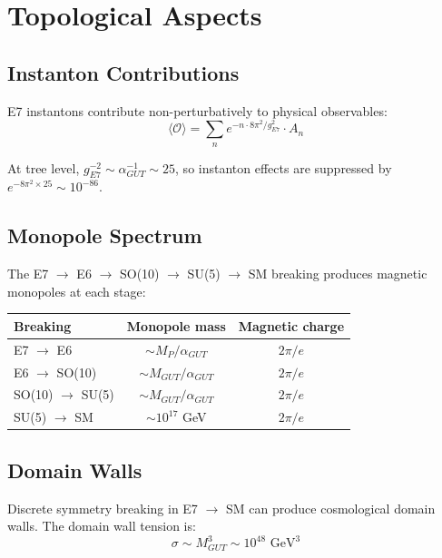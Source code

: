 \documentclass[11pt,a4paper]{article}
\begin{document}
\section{Topological Aspects}

\subsection{Instanton Contributions}

E7 instantons contribute non-perturbatively to physical observables:
\begin{equation}
\langle \mathcal{O} \rangle = \sum_n e^{-n \cdot 8\pi^2/g_{E7}^2} \cdot A_n
\end{equation}

At tree level, $g_{E7}^{-2} \sim \alpha_{GUT}^{-1} \sim 25$, so instanton effects are suppressed by $e^{-8\pi^2 \times 25} \sim 10^{-86}$.

\subsection{Monopole Spectrum}

The E7 $\to$ E6 $\to$ SO(10) $\to$ SU(5) $\to$ SM breaking produces magnetic monopoles at each stage:
\begin{center}
\begin{tabular}{|l|c|c|}
\hline
\textbf{Breaking} & \textbf{Monopole mass} & \textbf{Magnetic charge} \\
\hline
E7 $\to$ E6 & $\sim M_P / \alpha_{GUT}$ & $2\pi/e$ \\
E6 $\to$ SO(10) & $\sim M_{GUT} / \alpha_{GUT}$ & $2\pi/e$ \\
SO(10) $\to$ SU(5) & $\sim M_{GUT} / \alpha_{GUT}$ & $2\pi/e$ \\
SU(5) $\to$ SM & $\sim 10^{17}$ GeV & $2\pi/e$ \\
\hline
\end{tabular}
\end{center}

\subsection{Domain Walls}

Discrete symmetry breaking in E7 $\to$ SM can produce cosmological domain walls. The domain wall tension is:
\begin{equation}
\sigma \sim M_{GUT}^3 \sim 10^{48} \text{ GeV}^3
\end{equation}
\end{document}
